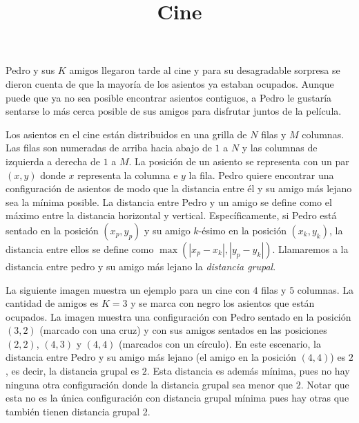 \documentclass{oci}
\title{Cine}
\begin{document}
\begin{problemDescription}
    Pedro y sus $K$ amigos llegaron tarde al cine y
    para su desagradable sorpresa se dieron cuenta
    de que la mayoría de los asientos ya estaban ocupados.
    Aunque puede que ya no sea posible encontrar
    asientos contiguos, a Pedro le gustaría sentarse
    lo más cerca posible de sus amigos para disfrutar
    juntos de la película.

    Los asientos en el cine están distribuidos en una
    grilla de $N$ filas y $M$ columnas.
    Las filas son numeradas de arriba hacia abajo
    de $1$ a $N$ y las columnas de izquierda a derecha
    de $1$ a $M$.
    La posición de un asiento se representa con un par
    $(x, y)$ donde $x$ representa la columna e $y$ la fila.
    Pedro quiere encontrar una configuración de asientos
    de modo que la distancia entre él y su amigo más
    lejano sea la mínima posible.
    La distancia entre Pedro y un amigo se define
    como el máximo entre la distancia horizontal y vertical.
    Específicamente, si Pedro está sentado en la posición
    $(x_p, y_p)$ y su amigo $k$-ésimo en la posición
    $(x_k, y_k)$, la distancia entre ellos se define como
    $\max(|x_p - x_k|, |y_p - y_k|)$.
    Llamaremos a la distancia entre pedro y su amigo más
    lejano la \emph{distancia grupal}.

    La siguiente imagen muestra un ejemplo para un cine
    con $4$ filas y $5$ columnas.
    La cantidad de amigos es $K=3$ y se marca con negro
    los asientos que están ocupados.
    La imagen muestra una configuración con Pedro sentado en
    la posición $(3, 2)$ (marcado con una cruz) y
    con sus amigos sentados en las posiciones $(2, 2)$, $(4, 3)$ y $(4, 4)$
    (marcados con un círculo).
    En este escenario, la distancia entre Pedro y su amigo
    más lejano (el amigo en la posición $(4, 4)$) es $2$,
    es decir, la distancia grupal es $2$.
    Esta distancia es además mínima, pues no hay ninguna
    otra configuración donde la distancia grupal
    sea menor que $2$.
    Notar que esta no es la única configuración con distancia
    grupal mínima pues hay otras que también tienen distancia
    grupal 2.

    \begin{figure}[h]
        \centering
        \begin{tikzpicture}


\end{tikzpicture}
\end{figure}
\end{problemDescription}
\end{document}
